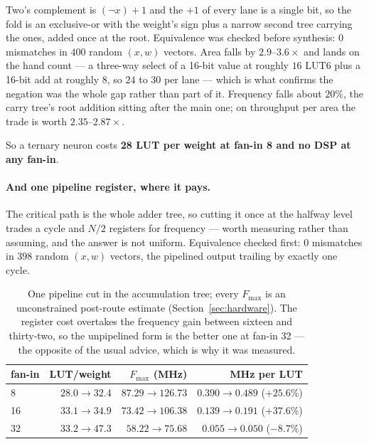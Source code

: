 \documentclass[11pt]{article}
\theoremstyle{definition}
\begin{document}
Two's complement is $(\lnot x)+1$ and the $+1$ of every lane is a single bit, so
the fold is an exclusive-or with the weight's sign plus a narrow second tree
carrying the ones, added once at the root. Equivalence was checked before
synthesis: $0$ mismatches in $400$ random $(x,w)$ vectors. Area falls by
$2.9$--$3.6\times$ and lands on the hand count --- a three-way select of a
16-bit value at roughly $16$ LUT6 plus a 16-bit add at roughly $8$, so $24$ to
$30$ per lane --- which is what confirms the negation was the whole gap rather
than part of it. Frequency falls about $20\%$, the carry tree's root addition
sitting after the main one; on throughput per area the trade is worth
$2.35$--$2.87\times$.

So a ternary neuron costs \textbf{28 LUT per weight at fan-in 8 and no DSP at
any fan-in}.

\paragraph{And one pipeline register, where it pays.} The critical path is the
whole adder tree, so cutting it once at the halfway level trades a cycle and
$N/2$ registers for frequency --- worth measuring rather than assuming, and the
answer is not uniform. Equivalence checked first: $0$ mismatches in $398$ random
$(x,w)$ vectors, the pipelined output trailing by exactly one cycle.

\begin{table}[t]\centering
\caption{One pipeline cut in the accumulation tree; every $F_{\max}$ is an
unconstrained post-route estimate (Section~\ref{sec:hardware}). The register cost overtakes
the frequency gain between sixteen and thirty-two, so the unpipelined form is
the better one at fan-in 32 --- the opposite of the usual advice, which is why it
was measured.}
\label{tab:nodepipe}
\begin{tabular}{lrrr}
\toprule
fan-in & LUT/weight & $F_{\max}$ (MHz) & MHz per LUT \\
\midrule
8  & $28.0\to\mathbf{32.4}$ & $87.29\to\mathbf{126.73}$ & $0.390\to0.489$ (\textbf{$+25.6\%$}) \\
16 & $33.1\to\mathbf{34.9}$ & $73.42\to\mathbf{106.38}$ & $0.139\to0.191$ (\textbf{$+37.6\%$}) \\
32 & $33.2\to47.3$ & $58.22\to75.68$ & $0.055\to0.050$ ($-8.7\%$) \\
\bottomrule
\end{tabular}
\end{table}
\end{document}
